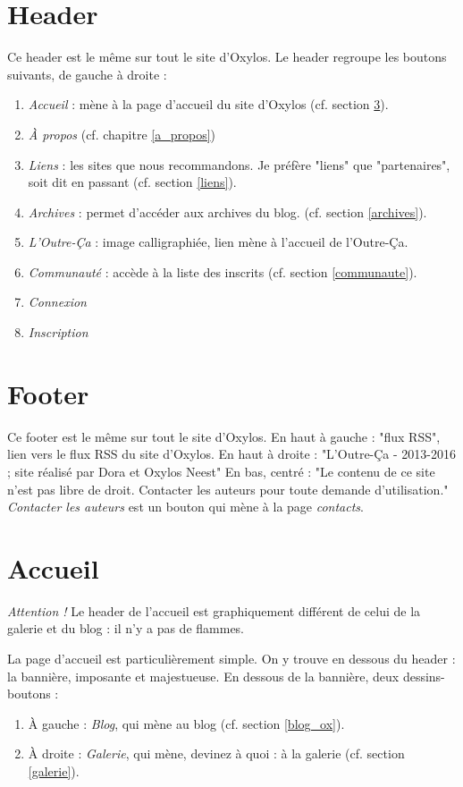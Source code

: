 \documentclass[french]{report}
\theoremstyle{plain}
\begin{document}
	\section{Header}
		Ce header est le même sur tout le site d'Oxylos.
		Le header regroupe les boutons suivants, de gauche à droite :
		\begin{enumerate}
			\item \emph{Accueil} : mène à la page d'accueil du site d'Oxylos (cf. section \ref{accueil_ox}).
			\item \emph{À propos} (cf. chapitre \ref{a_propos})
			\item \emph{Liens} : les sites que nous recommandons. Je préfère "liens" que "partenaires", soit dit en passant (cf. section \ref{liens}).
			\item \emph{Archives} : permet d'accéder aux archives du blog. (cf. section \ref{archives}).
			\item \emph{L'Outre-Ça} : image calligraphiée, lien mène à l'accueil de l'Outre-Ça.
			\item \emph{Communauté} : accède à la liste des inscrits (cf. section \ref{communaute}).
			\item \emph{Connexion} 
			\item \emph{Inscription} 
		\end{enumerate}

	\section{Footer}
		Ce footer est le même sur tout le site d'Oxylos.
		En haut à gauche : "flux RSS", lien vers le flux RSS du site d'Oxylos.
		En haut à droite : "L'Outre-Ça - 2013-2016 ; site réalisé par Dora et Oxylos Neest"
		En bas, centré : "Le contenu de ce site n'est pas libre de droit. Contacter les auteurs pour toute demande d'utilisation." \emph{Contacter les auteurs} est un bouton qui mène à la page \emph{contacts}.

	\section{Accueil}\label{accueil_ox}

		\emph{Attention !} Le header de l'accueil est graphiquement différent de celui de la galerie et du blog : il n'y a pas de flammes.

		La page d'accueil est particulièrement simple.
		On y trouve en dessous du header : la bannière, imposante et majestueuse.
		En dessous de la bannière, deux dessins-boutons :
		\begin{enumerate}
			\item À gauche : \emph{Blog}, qui mène au blog (cf. section \ref{blog_ox}).
			\item À droite : \emph{Galerie}, qui mène, devinez à quoi : à la galerie (cf. section \ref{galerie}). 
		\end{enumerate}
\end{document}
